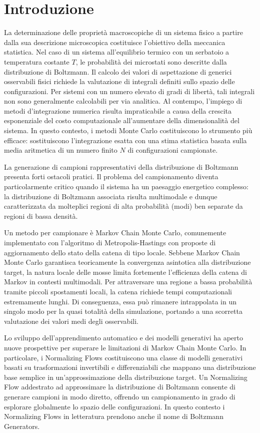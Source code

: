 \chapter*{Introduzione}
La determinazione delle proprietà macroscopiche di un sistema fisico a partire dalla sua descrizione microscopica costituisce l'obiettivo della meccanica statistica. Nel caso di un sistema all'equilibrio termico con un serbatoio a temperatura costante $T$, le probabilità dei microstati sono descritte dalla distribuzione di Boltzmann. 
Il calcolo dei valori di aspettazione di generici osservabili fisici richiede la valutazione di integrali definiti sullo spazio delle configurazioni.
Per sistemi con un numero elevato di gradi di libertà, tali integrali non sono generalmente calcolabili per via analitica. Al contempo, l'impiego di metodi d'integrazione numerica risulta impraticabile a causa della crescita esponenziale del costo computazionale all'aumentare della dimensionalità del sistema. In questo contesto, i metodi Monte Carlo costituiscono lo strumento più efficace: sostituiscono l'integrazione esatta con una stima statistica basata sulla media aritmetica di un numero finito $N$ di configurazioni campionate.

La generazione di campioni rappresentativi della distribuzione di Boltzmann presenta forti ostacoli pratici. Il problema del campionamento diventa particolarmente critico quando il sistema ha un paesaggio energetico complesso: la distribuzione di Boltzmann associata risulta multimodale e dunque caratterizzata da molteplici regioni di alta probabilità (modi) ben separate da regioni di bassa densità.

Un metodo per campionare è Markov Chain Monte Carlo, comunemente implementato con l'algoritmo di Metropolis-Hastings con proposte di aggiornamento dello stato della catena di tipo locale. Sebbene Markov Chain Monte Carlo garantisca teoricamente la convergenza asintotica alla distribuzione target, la natura locale delle mosse limita fortemente l'efficienza della catena di Markov in contesti multimodali. Per attraversare una regione a bassa probabilità tramite piccoli spostamenti locali, la catena richiede tempi computazionali estremamente lunghi. Di conseguenza, essa può rimanere intrappolata in un singolo modo per la quasi totalità della simulazione, portando a una scorretta valutazione dei valori medi degli osservabili.

Lo sviluppo dell'apprendimento automatico e dei modelli generativi ha aperto nuove prospettive per superare le limitazioni di Markov Chain Monte Carlo. In particolare, i Normalizing Flows costituiscono una classe di modelli generativi basati su trasformazioni invertibili e differenziabili che mappano una distribuzione base semplice in un'approssimazione della distribuzione target. Un Normalizing Flow addestrato ad approssimare la distribuzione di Boltzmann consente di generare campioni in modo diretto, offrendo un campionamento in grado di esplorare globalmente lo spazio delle configurazioni. In questo contesto i Normalizing Flows in letteratura prendono anche il nome di Boltzmann Generators.

